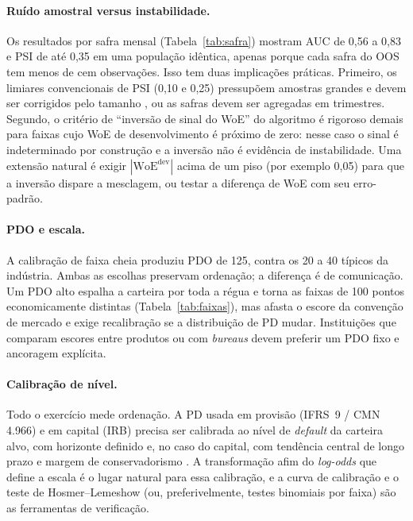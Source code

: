 \documentclass[11pt,a4paper]{article}
\newcommand{\woe}{\mathrm{WoE}}
\begin{document}
\paragraph{Ruído amostral versus instabilidade.} Os resultados por safra mensal (Tabela~\ref{tab:safra}) mostram AUC de 0{,}56 a 0{,}83 e PSI de até 0{,}35 em uma população idêntica, apenas porque cada safra do OOS tem menos de cem observações. Isso tem duas implicações práticas. Primeiro, os limiares convencionais de PSI (0{,}10 e 0{,}25) pressupõem amostras grandes e devem ser corrigidos pelo tamanho \citep{yurdakul2018}, ou as safras devem ser agregadas em trimestres. Segundo, o critério de ``inversão de sinal do WoE'' do algoritmo é rigoroso demais para faixas cujo WoE de desenvolvimento é próximo de zero: nesse caso o sinal é indeterminado por construção e a inversão não é evidência de instabilidade. Uma extensão natural é exigir $|\woe^{\text{dev}}|$ acima de um piso (por exemplo 0{,}05) para que a inversão dispare a mesclagem, ou testar a diferença de WoE com seu erro-padrão.

\paragraph{PDO e escala.} A calibração de faixa cheia produziu PDO de 125, contra os 20 a 40 típicos da indústria. Ambas as escolhas preservam ordenação; a diferença é de comunicação. Um PDO alto espalha a carteira por toda a régua e torna as faixas de 100 pontos economicamente distintas (Tabela~\ref{tab:faixas}), mas afasta o escore da convenção de mercado e exige recalibração se a distribuição de PD mudar. Instituições que comparam escores entre produtos ou com \emph{bureaus} devem preferir um PDO fixo e ancoragem explícita.

\paragraph{Calibração de nível.} Todo o exercício mede ordenação. A PD usada em provisão (IFRS~9 / CMN 4.966) e em capital (IRB) precisa ser calibrada ao nível de \emph{default} da carteira alvo, com horizonte definido e, no caso do capital, com tendência central de longo prazo e margem de conservadorismo \citep{bcbs2005,bcb3648}. A transformação afim do \emph{log-odds} que define a escala é o lugar natural para essa calibração, e a curva de calibração e o teste de Hosmer--Lemeshow (ou, preferivelmente, testes binomiais por faixa) são as ferramentas de verificação.
\end{document}
